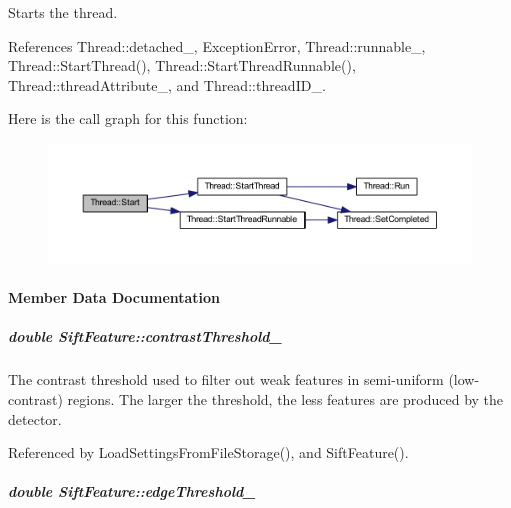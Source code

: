 Starts the thread. 



References Thread\-::detached\-\_\-, Exception\-Error, Thread\-::runnable\-\_\-, Thread\-::\-Start\-Thread(), Thread\-::\-Start\-Thread\-Runnable(), Thread\-::thread\-Attribute\-\_\-, and Thread\-::thread\-I\-D\-\_\-.



Here is the call graph for this function\-:
\nopagebreak
\begin{figure}[H]
\begin{center}
\leavevmode
\includegraphics[width=350pt]{group___core_a2b42f82341afd2747ea093b6ac8b91cb_cgraph}
\end{center}
\end{figure}




\paragraph{Member Data Documentation}
\hypertarget{group___feature_extractor_af2a77eef4388e7b3504142218baee770}{
\subparagraph[{contrast\-Threshold\-\_\-}]{\setlength{\rightskip}{0pt plus 5cm}double Sift\-Feature\-::contrast\-Threshold\-\_\-\hspace{0.3cm}{\ttfamily [private]}}}\label{group___feature_extractor_af2a77eef4388e7b3504142218baee770}


The contrast threshold used to filter out weak features in semi-\/uniform (low-\/contrast) regions. The larger the threshold, the less features are produced by the detector. 



Referenced by Load\-Settings\-From\-File\-Storage(), and Sift\-Feature().

\hypertarget{group___feature_extractor_a8fc64eb5826c05c5fe8c0893cc24ff0a}{
\subparagraph[{edge\-Threshold\-\_\-}]{\setlength{\rightskip}{0pt plus 5cm}double Sift\-Feature\-::edge\-Threshold\-\_\-\hspace{0.3cm}{\ttfamily [private]}}}\label{group___feature_extractor_a8fc64eb5826c05c5fe8c0893cc24ff0a}


